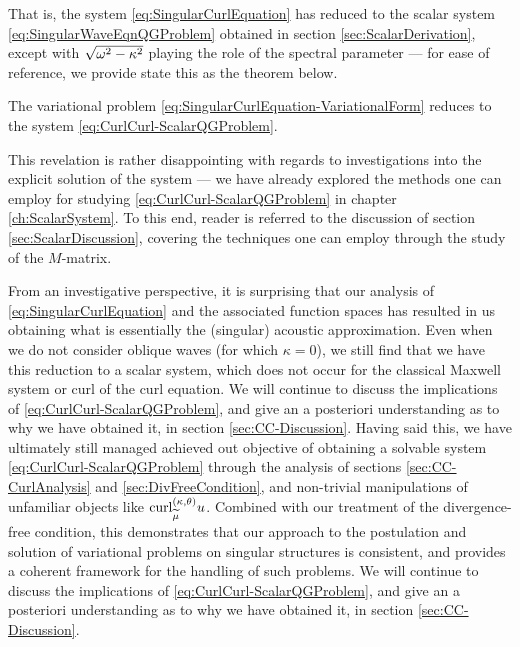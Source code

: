 That is, the system \eqref{eq:SingularCurlEquation} has reduced to the scalar system \eqref{eq:SingularWaveEqnQGProblem} obtained in section \ref{sec:ScalarDerivation}, except with $\sqrt{\omega^2-\kappa^2}$ playing the role of the spectral parameter --- for ease of reference, we provide state this as the theorem below.
\begin{theorem} \label{thm:CurlCurlReduction-Theorem}
	The variational problem \eqref{eq:SingularCurlEquation-VariationalForm} reduces to the system \eqref{eq:CurlCurl-ScalarQGProblem}.
\end{theorem}
This revelation is rather disappointing with regards to investigations into the explicit solution of the system --- we have already explored the methods one can employ for studying \eqref{eq:CurlCurl-ScalarQGProblem} in chapter \ref{ch:ScalarSystem}.
To this end, reader is referred to the discussion of section \ref{sec:ScalarDiscussion}, covering the techniques one can employ through the study of the $M$-matrix.

From an investigative perspective, it is surprising that our analysis of \eqref{eq:SingularCurlEquation} and the associated function spaces has resulted in us obtaining what is essentially the (singular) acoustic approximation.
Even when we do not consider oblique waves (for which $\kappa=0$), we still find that we have this reduction to a scalar system, which does not occur for the classical Maxwell system or curl of the curl equation.
We will continue to discuss the implications of \eqref{eq:CurlCurl-ScalarQGProblem}, and give an a posteriori understanding as to why we have obtained it, in section \ref{sec:CC-Discussion}.
Having said this, we have ultimately still managed achieved out objective of obtaining a solvable system \eqref{eq:CurlCurl-ScalarQGProblem} through the analysis of sections \ref{sec:CC-CurlAnalysis} and \ref{sec:DivFreeCondition}, and non-trivial manipulations of unfamiliar objects like $\mathrm{curl}_{\widetilde{\mu}}^{\left( \kappa, \theta \right)}u$.
Combined with our treatment of the divergence-free condition, this demonstrates that our approach to the postulation and solution of variational problems on singular structures is consistent, and provides a coherent framework for the handling of such problems.
We will continue to discuss the implications of \eqref{eq:CurlCurl-ScalarQGProblem}, and give an a posteriori understanding as to why we have obtained it, in section \ref{sec:CC-Discussion}.

